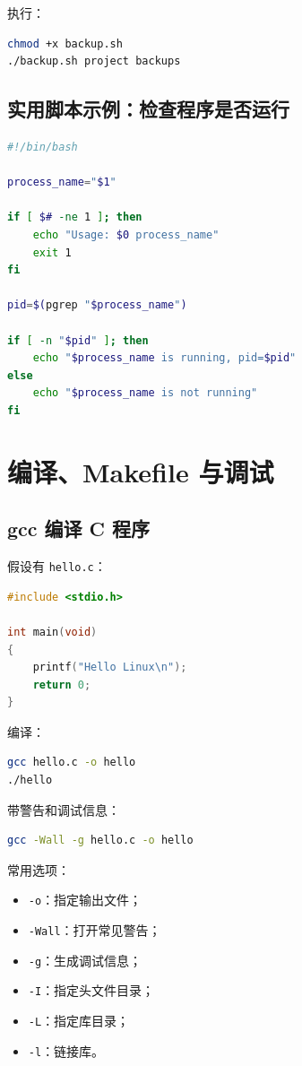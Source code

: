 \documentclass[UTF8,a4paper,12pt]{ctexart}
\begin{document}
执行：

\begin{lstlisting}[language=bash]
chmod +x backup.sh
./backup.sh project backups
\end{lstlisting}

\subsection{实用脚本示例：检查程序是否运行}

\begin{lstlisting}[language=bash]
#!/bin/bash

process_name="$1"

if [ $# -ne 1 ]; then
    echo "Usage: $0 process_name"
    exit 1
fi

pid=$(pgrep "$process_name")

if [ -n "$pid" ]; then
    echo "$process_name is running, pid=$pid"
else
    echo "$process_name is not running"
fi
\end{lstlisting}

\section{编译、Makefile 与调试}

\subsection{gcc 编译 C 程序}

假设有 \texttt{hello.c}：

\begin{lstlisting}[language=C]
#include <stdio.h>

int main(void)
{
    printf("Hello Linux\n");
    return 0;
}
\end{lstlisting}

编译：

\begin{lstlisting}[language=bash]
gcc hello.c -o hello
./hello
\end{lstlisting}

带警告和调试信息：

\begin{lstlisting}[language=bash]
gcc -Wall -g hello.c -o hello
\end{lstlisting}

常用选项：
\begin{itemize}
    \item \texttt{-o}：指定输出文件；
    \item \texttt{-Wall}：打开常见警告；
    \item \texttt{-g}：生成调试信息；
    \item \texttt{-I}：指定头文件目录；
    \item \texttt{-L}：指定库目录；
    \item \texttt{-l}：链接库。
\end{itemize}
\end{document}
